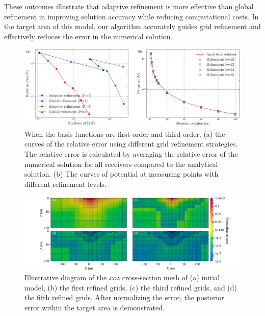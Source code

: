 \documentclass[extra, referee]{gji}
\begin{document}
These outcomes illustrate that adaptive refinement is more effective than global
refinement in improving solution accuracy while reducing computational costs. In
the target area of this model, our algorithm accurately guides grid refinement
and effectively reduces the error in the numerical solution.

\begin{figure}
  \centering
  \includegraphics[width=1\linewidth]{fig/halfspace_relative_err.pdf}
  \caption{When the basis functions are first-order and third-order, (a) the curves of the relative error using different grid refinement strategies. The relative error is calculated by averaging the relative error of the numerical solution for all receivers compared to the analytical solution. (b) The curves of potential at measuring points with different refinement levels. }
  \label{fig:halfspace_relative_err}
\end{figure}
\begin{figure}
  \centering
  \includegraphics[width=1.0\textwidth]{fig/halfsapce_adaptive_effect.pdf}
  \caption{Illustrative diagram of the $xoz$ cross-section mesh of (a) initial model, (b) the first refined grids, (c) the third refined grids, and (d) the fifth refined grids. After normalizing the error, the posterior error within the target area is demonstrated.}
  \label{fig:halfsapce_adaptive_effect}
\end{figure}
\end{document}

